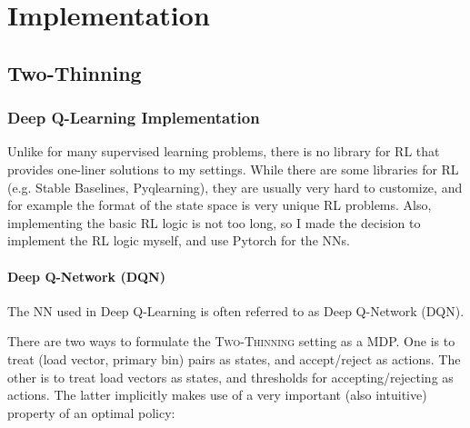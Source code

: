 \chapter{Implementation}\label{implementation}

\ifpdf
    \graphicspath{{Chapter3/Figs/Raster/}{Chapter3/Figs/PDF/}{Chapter3/Figs/}}
\else
    \graphicspath{{Chapter3/Figs/Vector/}{Chapter3/Figs/}}
\fi

\section{Two-Thinning}


\subsection{Deep Q-Learning Implementation}


Unlike for many supervised learning problems, there is no library for RL that provides one-liner solutions to my settings. While there are some libraries for RL (e.g. Stable Baselines, Pyqlearning), they are usually very hard to customize, and for example the format of the state space is very unique RL problems. Also, implementing the basic RL logic is not too long, so I made the decision to implement the RL logic myself, and use Pytorch for the NNs.




\subsubsection{Deep Q-Network (DQN)} \label{DQN}


The NN used in Deep Q-Learning is often referred to as Deep Q-Network (DQN). 


There are two ways to formulate the \textsc{Two-Thinning} setting as a MDP. One is to treat (load vector, primary bin) pairs as states, and accept/reject as actions. The other is to treat load vectors as states, and thresholds for accepting/rejecting as actions. The latter implicitly makes use of a very important (also intuitive) property of an optimal policy:


